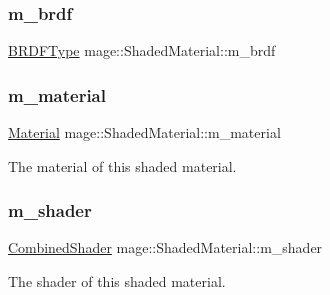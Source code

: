\subsubsection{\texorpdfstring{m\+\_\+brdf}{m\_brdf}}
{\footnotesize\ttfamily \hyperlink{namespacemage_ae7a7a03a7b34d7e2689689bb8295cd38}{B\+R\+D\+F\+Type} mage\+::\+Shaded\+Material\+::m\+\_\+brdf\hspace{0.3cm}{\ttfamily [private]}}

\hypertarget{structmage_1_1_shaded_material_a319e1ca2103c50f84ce0605b08bd34b4}{}\label{structmage_1_1_shaded_material_a319e1ca2103c50f84ce0605b08bd34b4} 
\subsubsection{\texorpdfstring{m\+\_\+material}{m\_material}}
{\footnotesize\ttfamily \hyperlink{structmage_1_1_material}{Material} mage\+::\+Shaded\+Material\+::m\+\_\+material\hspace{0.3cm}{\ttfamily [private]}}

The material of this shaded material. \hypertarget{structmage_1_1_shaded_material_a712d07ac1995ff592bbb8ab20a294270}{}\label{structmage_1_1_shaded_material_a712d07ac1995ff592bbb8ab20a294270} 
\subsubsection{\texorpdfstring{m\+\_\+shader}{m\_shader}}
{\footnotesize\ttfamily \hyperlink{structmage_1_1_combined_shader}{Combined\+Shader} mage\+::\+Shaded\+Material\+::m\+\_\+shader\hspace{0.3cm}{\ttfamily [private]}}

The shader of this shaded material. 